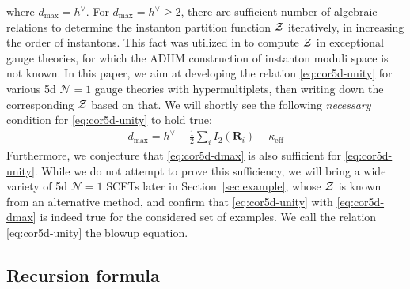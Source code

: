 \documentclass[letterpaper, 11pt]{article}
\def\CZ{{\cal Z}}
\begin{document}
where $d_\text{max} = h^\vee$. For $d_\text{max} = h^\vee \geq 2$, there are sufficient number of algebraic relations to determine the instanton partition function $\CZ$ iteratively, in increasing the order of instantons. This fact was utilized in \cite{Keller:2012da} to compute $\CZ$ in exceptional gauge theories, for which the ADHM construction of instanton moduli space is not known. In this paper, we aim at developing the relation \eqref{eq:cor5d-unity} for various 5d 
$\mathcal{N}=1$ gauge theories with hypermultiplets, then writing down the corresponding $\CZ$ based on that. We will shortly see the following  
\emph{necessary} condition for \eqref{eq:cor5d-unity} to hold true:
\begin{align}
  \label{eq:cor5d-dmax}
  d_\text{max} = h^\vee - \frac{1}{2}\sum_i I_2(\mathbf{R}_i)  - \kappa_\text{eff}
\end{align}
Furthermore, we conjecture that \eqref{eq:cor5d-dmax} is also sufficient for \eqref{eq:cor5d-unity}. While we do not attempt to prove this sufficiency, we will bring a wide variety of 5d $\mathcal{N}=1$ SCFTs later in Section~\ref{sec:example}, whose $\CZ$ is known from an alternative method, and confirm that \eqref{eq:cor5d-unity} with \eqref{eq:cor5d-dmax} is indeed true for the considered set of examples. We call the relation \eqref{eq:cor5d-unity} the blowup equation. 


\subsection{Recursion formula}
\label{subsec:recursion}
\end{document}
